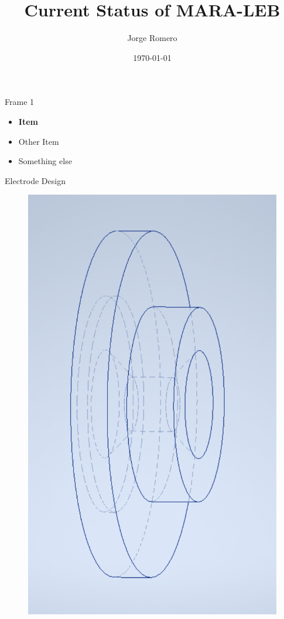 \documentclass{beamer}
\title{Current Status of MARA-LEB}
\date{\today}
\author[auth]{Jorge Romero}
\begin{document}
\begin{frame}
\titlepage
\end{frame}
\begin{frame}{Frame 1}
    \begin{itemize}
        \item \textbf{Item}
        \item Other Item \cite{article}
        \item Something else \cite{inbook}
    \end{itemize}
\end{frame}
\begin{frame}{Electrode Design}
    \vspace*{2.5em}
    \begin{figure}
        \centering
        \includegraphics[scale=0.2]{oldchamfer.pdf}\hspace{2em}

\end{figure}
\end{frame}
\end{document}
